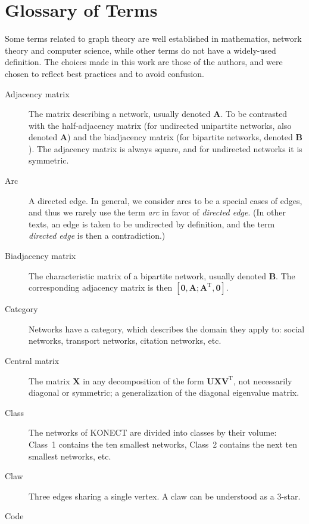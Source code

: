 \documentclass{article}
\begin{document}
\appendix

\section{Glossary of Terms}

Some terms related to graph theory are well established in mathematics,
network theory and computer science, while other terms do not have a
widely-used definition.  
The choices made in this work are those of the authors, and were chosen
to reflect best practices and to avoid confusion.

\begin{description}
  \item[Adjacency matrix]
    The matrix describing a network, usually denoted $\mathbf A$.  To be
    contrasted with the 
    half-adjacency matrix (for undirected unipartite networks, also
    denoted $\mathbf A$) and the
    biadjacency matrix (for bipartite networks, denoted $\mathbf B$). 
    The adjacency matrix is always square, and for undirected networks
    it is symmetric. 
  \item[Arc] A directed edge.  In general, we consider arcs to be a
    special cases of edges, and thus we rarely use the term \emph{arc}
    in favor of \emph{directed edge}.  (In other texts, an edge is taken
    to be undirected by definition, and the term \emph{directed edge} is
    then a contradiction.)
  \item[Biadjacency matrix]
    The characteristic matrix of a bipartite network, usually denoted
    $\mathbf B$.  The corresponding adjacency matrix is then $[\mathbf
      0, \mathbf A; \mathbf A^{\mathrm T}, \mathbf 0]$. 
  \item[Category] Networks have a category, which describes the domain
    they apply to:  social networks, transport networks, citation
    networks, etc. 
  \item[Central matrix] The matrix $\mathbf X$ in any decomposition
    of the form $\mathbf U \mathbf X \mathbf V^{\mathrm T}$, not necessarily
    diagonal or symmetric; a generalization of the diagonal eigenvalue
    matrix.
  \item[Class]
    The networks of KONECT are divided into classes by their volume:
    Class~1 contains the ten smallest networks, Class~2 contains the
    next ten smallest networks, etc.  
  \item[Claw]
    Three edges sharing a single vertex.  A claw can be understood as a 3-star. 
  \item[Code]

\end{description}
\end{document}
